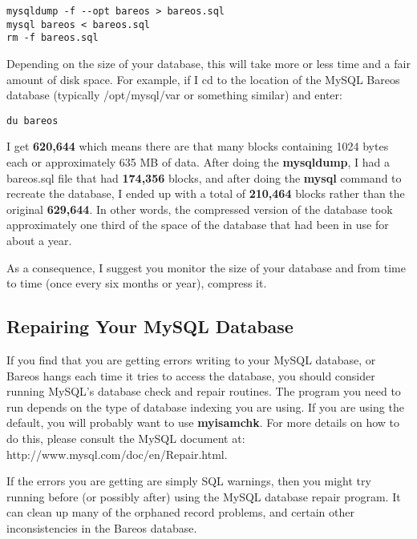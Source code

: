 \footnotesize
\begin{verbatim}
mysqldump -f --opt bareos > bareos.sql
mysql bareos < bareos.sql
rm -f bareos.sql
\end{verbatim}
\normalsize

Depending on the size of your database, this will take more or less time and a
fair amount of disk space. For example, if I cd to the location of the MySQL
Bareos database (typically /opt/mysql/var or something similar) and enter:

\footnotesize
\begin{verbatim}
du bareos
\end{verbatim}
\normalsize

I get {\bf 620,644} which means there are that many blocks containing 1024
bytes each or approximately 635 MB of data. After doing the {\bf mysqldump}, I
had a bareos.sql file that had {\bf 174,356} blocks, and after doing the {\bf
mysql} command to recreate the database, I ended up with a total of {\bf
210,464} blocks rather than the original {\bf 629,644}. In other words, the
compressed version of the database took approximately one third of the space
of the database that had been in use for about a year.

As a consequence, I suggest you monitor the size of your database and from
time to time (once every six months or year), compress it.

\label{DatabaseRepair}
\label{RepairingMySQL}
\subsection{Repairing Your MySQL Database}

If you find that you are getting errors writing to your MySQL database, or
Bareos hangs each time it tries to access the database, you should consider
running MySQL's database check and repair routines. The program you need to
run depends on the type of database indexing you are using. If you are using
the default, you will probably want to use {\bf myisamchk}. For more details
on how to do this, please consult the MySQL document at:
{http://www.mysql.com/doc/en/Repair.html}.

If the errors you are getting are simply SQL warnings, then you might try
running  before (or possibly after) using the MySQL database repair
program. It can clean up many of the orphaned record problems, and certain
other inconsistencies in the Bareos database.

